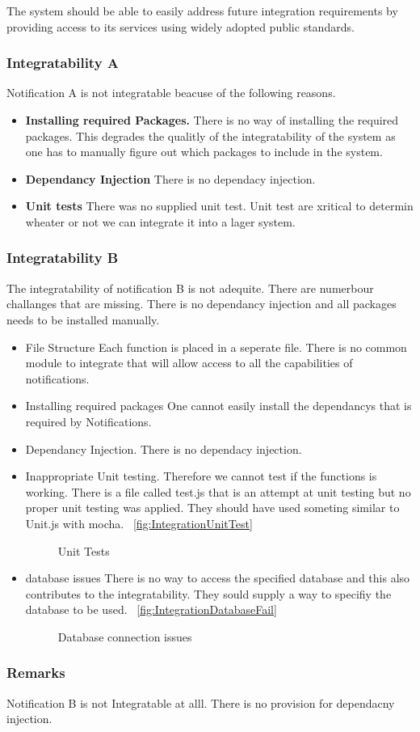 The system should be able to easily address future integration requirements by providing access to its services using widely adopted public standards.
\subsubsection*{Integratability A}
Notification A is not integratable beacuse of the following reasons.
\begin{itemize}
	\item \textbf{Installing required Packages.}
	There is no way of installing the required packages. This degrades the qualitly of the integratability of the system as one has to manually figure out which packages to include in the system.
	\item \textbf{Dependancy Injection}
	There is no dependacy injection.
	\item \textbf{Unit tests}
	There was no supplied unit test. Unit test are xritical to determin wheater or not we can integrate it into a lager system.
\end{itemize}
\subsubsection*{Integratability B}
The integratability of notification B is not adequite. There are numerbour challanges that are missing. There is no dependancy injection and all packages needs to be installed manually.
\begin{itemize}
	\item {File Structure} 
	Each function is placed in a seperate file. There is no common module to integrate that will allow access to all the capabilities of notifications.
	\item Installing required packages
	One cannot easily install the dependancys that is required by Notifications.
	\item Dependancy Injection.
	There is no dependacy injection.
	\item
	Inappropriate Unit testing. Therefore we cannot test if the functions is working. There is a file called test.js that is an attempt at unit testing but no proper unit testing was applied. They should have used someting similar to Unit.js with mocha.
		~\ref{fig:IntegrationUnitTest}
		\begin{figure}[H]
			\centering
			\caption{Unit Tests}
			\label{fig:scope}
		\end{figure}
	\item database issues
	There is no way to access the specified database and this also contributes to the integratability. They sould supply a way to specifiy the database to be used.
		~\ref{fig:IntegrationDatabaseFail}
		\begin{figure}[H]
			\centering
			\caption{Database connection issues}
			\label{fig:scope}
		\end{figure}
\end{itemize}
\subsubsection*{Remarks}
Notification B is not Integratable at alll. There is no provision for dependacny injection.